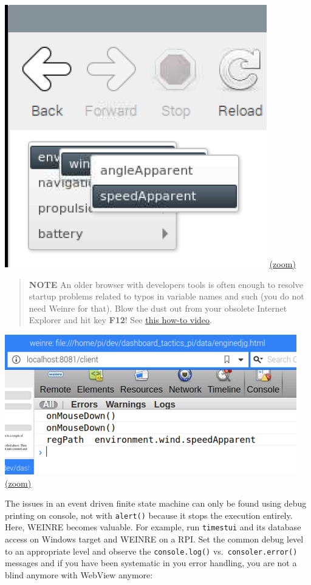 \documentclass[11pt]{article}
\begin{document}
    \includegraphics{2019-12-25_weinre_server_console_mouse_event.png}
\href{img/2019-12-25_weinre_server_console_mouse_event.png}{(zoom)}

    \begin{quote}
\textbf{NOTE} An older browser with developers tools is often enough to
resolve startup problems related to typos in variable names and such
(you do not need Weinre for that). Blow the dust out from your obsolete
Internet Explorer and hit key \textbf{F12}! See
\href{https://vimeo.com/396195423}{this how-to video}.
\end{quote}

    \includegraphics{2019-12-25_weinre_server_console_mouse_event_log.png}
\href{img/2019-12-25_weinre_server_console_mouse_event_log.png}{(zoom)}

    The issues in an event driven finite state machine can only be found
using debug printing on console, not with \texttt{alert()} because it
stops the execution entirely. Here, WEINRE becomes valuable. For
example, run \texttt{timestui} and its database access on Windows target
and WEINRE on a RPI. Set the common debug level to an appropriate level
and observe the \texttt{console.log()} vs.~\texttt{consoler.error()}
messages and if you have been systematic in you error handling, you are
not a blind anymore with WebView anymore:
\end{document}
